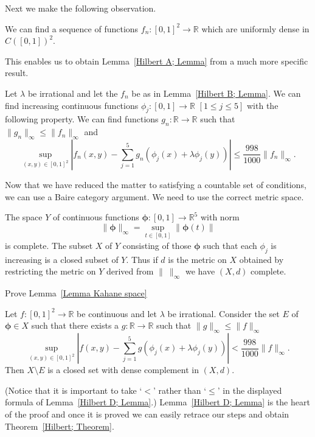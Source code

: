 Next we make the following observation.
\begin{lemma}\label{Hilbert B; Lemma} We can find
a sequence of functions $f_{n}:[0,1]^{2}\rightarrow{\mathbb R}$
which are uniformly dense in $C([0,1])^{2}$.
\end{lemma}
This enables us to obtain Lemma~\ref{Hilbert A; Lemma}
from a much more specific result.
\begin{lemma}\label{Hilbert C; Lemma} Let $\lambda$ be irrational
and let the $f_{n}$ be as in Lemma~\ref{Hilbert B; Lemma}.
We can find increasing continuous functions
$\phi_{j}:[0,1]\rightarrow{\mathbb R}$ $[1\leq j\leq 5]$
with the following property. We can find 
functions $g_{n}:{\mathbb R}\rightarrow{\mathbb R}$ such that
$\|g_{n}\|_{\infty}\leq\|f_{n}\|_{\infty}$ and 
\[\sup_{(x,y)\in[0,1]^{2}}
\left|f_{n}(x,y)-\sum_{j=1}^{5}g_{n}(\phi_{j}(x)+\lambda\phi_{j}(y))
\right|\leq \frac{998}{1000}\|f_{n}\|_{\infty}.\]
\end{lemma}

Now that we have reduced the matter to 
satisfying a countable set of conditions,
we can use a Baire category argument.
We need to use the correct metric space.
\begin{lemma}\label{Lemma Kahane space}
The space $Y$ of continuous functions
${\boldsymbol \phi}:[0,1]\rightarrow{\mathbb R}^{5}$
with norm
\[\|{\boldsymbol \phi}\|_{\infty}=
\sup_{t\in[0,1]}\|{\boldsymbol \phi}(t)\|\]
is complete. The subset $X$ of $Y$ consisting of
those ${\boldsymbol \phi}$ such that each $\phi_{j}$
is increasing is a closed
subset of $Y$. Thus if $d$ is the metric on $X$
obtained by restricting the metric on $Y$ derived from
$\|\ \|_{\infty}$  we have $(X,d)$ complete.
\end{lemma}
\begin{exercise} Prove Lemma~\ref{Lemma Kahane space}
\end{exercise}

\begin{lemma}\label{Hilbert D; Lemma}  Let
$f:[0,1]^{2}\rightarrow{\mathbb R}$ be continuous
and let $\lambda$ be irrational. Consider the
set $E$ of ${\boldsymbol \phi}\in X$ such that
there exists a 
$g:{\mathbb R}\rightarrow{\mathbb R}$ such that
$\|g\|_{\infty}\leq\|f\|_{\infty}$
\[\sup_{(x,y)\in[0,1]^{2}}
\left|f(x,y)-\sum_{j=1}^{5}g(\phi_{j}(x)+\lambda\phi_{j}(y))
\right|<\frac{998}{1000}\|f\|_{\infty}.\]
Then $X\setminus E$ is a closed set with dense complement
in $(X,d)$.
\end{lemma}
(Notice that it is important to take `$<$' rather than
`$\leq$' in the displayed formula of Lemma~\ref{Hilbert D; Lemma}.)
Lemma~\ref{Hilbert D; Lemma} is the heart of the proof
and once it is proved we can easily retrace our steps
and obtain Theorem~\ref{Hilbert; Theorem}.

